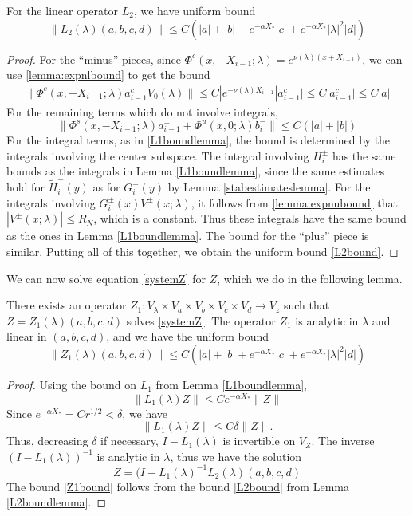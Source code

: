 \documentclass[thesis.tex]{subfiles}
\begin{document}
\begin{lemma}\label{L2boundlemma}
For the linear operator $L_2$, we have uniform bound
\begin{equation}\label{L2bound}
\| L_2(\lambda) (a,b,c,d) \| \leq C\left(|a| + |b| + e^{-\alpha X_*} |c| + e^{-\alpha X_*}|\lambda|^2|d|\right)
\end{equation}
\begin{proof}
For the ``minus'' pieces, since $\Phi^c(x, -X_{i-1}; \lambda) = e^{\nu(\lambda)(x + X_{i-1})}$, we can use \cref{lemma:expnlbound} to get the bound
\begin{align*}
\| \Phi^c(x, -X_{i-1}; \lambda) a_{i-1}^c V_0(\lambda) \| \leq C |e^{-\nu(\lambda)X_{i-1}}|a_{i-1}^c| \leq C |a_{i-1}^c| \leq C |a|
\end{align*}
For the remaining terms which do not involve integrals,
\[
\| \Phi^s(x, -X_{i-1}; \lambda) a_{i-1}^- + \Phi^u(x, 0; \lambda) b_i^- \| \leq C(|a| + |b|)
\]
For the integral terms, as in \cref{L1boundlemma}, the bound is determined by the integrals involving the center subspace. The integral involving $H_i^\pm$ has the same bounds as the integrals in Lemma \ref{L1boundlemma}, since the same estimates hold for $\tilde{H}_i^-(y)$ as for $G_i^-(y)$ by Lemma \ref{stabestimateslemma}. For the integrals involving $G_i^\pm(x) V^\pm(x; \lambda)$, it follows from \cref{lemma:expnubound} that $|V^\pm(x; \lambda)| \leq R_N$, which is a constant. Thus these integrals have the same bound as the ones in Lemma \ref{L1boundlemma}. The bound for the ``plus'' piece is similar. Putting all of this together, we obtain the uniform bound \cref{L2bound}.
\end{proof}
\end{lemma}

We can now solve equation \eqref{systemZ} for $Z$, which we do in the following lemma.

\begin{lemma}\label{Zinv0}
There exists an operator $Z_1: V_\lambda \times V_a \times V_b \times V_c \times V_d \rightarrow V_z$ such that $Z = Z_1(\lambda)(a,b,c,d)$ solves \eqref{systemZ}. The operator $Z_1$ is analytic in $\lambda$ and linear in $(a,b,c,d)$, and we have the uniform bound
\begin{equation}\label{Z1bound}
\| Z_1(\lambda)(a,b,c,d) \| \leq C\left(|a| + |b| + e^{-\alpha X_*} |c| + e^{-\alpha X_*}|\lambda|^2|d|\right)
\end{equation}
\begin{proof}
Using the bound on $L_1$ from Lemma \ref{L1boundlemma}, 
\[
\|L_1(\lambda)Z\| \leq C e^{-\alpha X_*}\|Z\|
\]
Since $e^{-\alpha X_*} = C r^{1/2} < \delta$, we have
\[
\|L_1(\lambda)Z\| \leq C \delta \|Z\|.
\]
Thus, decreasing $\delta$ if necessary, $I - L_1(\lambda)$ is invertible on $V_Z$. The inverse $(I - L_1(\lambda))^{-1}$ is analytic in $\lambda$, thus we have the solution
\begin{equation}\label{L1L2eq}
Z = (I - L_1(\lambda)^{-1}L_2(\lambda)(a,b,c,d)
\end{equation}
The bound \eqref{Z1bound} follows from the bound \eqref{L2bound} from Lemma \ref{L2boundlemma}.
\end{proof}
\end{lemma}
\end{document}
